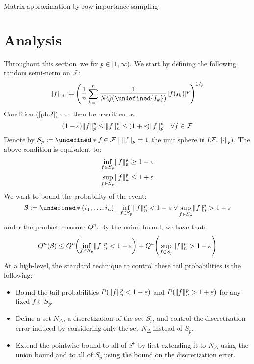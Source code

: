 \documentclass{article}
\theoremstyle{plain}
\theoremstyle{definition}
\theoremstyle{remark}
\newcommand{\defeq}{\vcentcolon=}
\let\brace\undefined
\DeclarePairedDelimiter{\brace}{\lbrace}{\rbrace}
\DeclarePairedDelimiter{\paren}{\lparen}{\rparen}
\newcommand{\eps}{\varepsilon}
\newcommand{\R}{\mathbb{R}}
\DeclarePairedDelimiter{\abs}{\lvert}{\rvert}
\DeclarePairedDelimiter{\norm}{\lVert}{\rVert}
\begin{document}
\begin{algorithm}
\caption{Matrix approximation by row importance sampling}
\label{alg:1}
\begin{algorithmic}[1]
    \State{$\widehat{F} \gets 0 \in \R^{n \times d}$}
    \EndFor
\EndFunction
\end{algorithmic}
\end{algorithm}



\section{Analysis}
Throughout this section, we fix $p \in [1, \infty)$. We start by defining the following random semi-norm on $\mathcal{F}$:
\begin{equation*}
    \norm{f}_n \defeq \paren*{\frac{1}{n} \sum_{k=1}^{n} \frac{1}{NQ(\brace{I_k})} \abs{f(I_k)}^p}^{1/p}
\end{equation*}
Condition (\ref{pb:2}) can then be rewritten as:
\begin{equation*}
    (1 - \eps) \norm{f}_p^p \leq \norm{f}_n^p \leq (1 + \eps) \norm{f}_p^p \quad \forall f \in \mathcal{F}
\end{equation*}
Denote by $S_p \defeq \brace*{f \in \mathcal{F} \mid \norm{f}_p = 1}$ the unit sphere in $(\mathcal{F}, \norm{\cdot}_p)$. The above condition is equivalent to:
\begin{align*}
    \inf_{f \in S_p} \norm{f}_{n}^p &\geq 1 - \eps \\ 
    \sup_{f \in S_p} \norm{f}_n^p &\leq 1 + \eps
\end{align*}
We want to bound the probability of the event:
\begin{equation*}
    \mathcal{B} \defeq \brace*{(i_1, \dotsc, i_n) \mid \inf_{f \in S_p} \norm{f}_{n}^p < 1 - \eps \lor \sup_{f \in S_p} \norm{f}_n^p > 1 + \eps}
\end{equation*}
under the product measure $Q^{n}$. By the union bound, we have that:
\begin{equation*}
    Q^{n}(\mathcal{B}) \leq Q^{n}\paren*{\inf_{f \in S_p} \norm{f}_{n}^p < 1 - \eps} + Q^{n}\paren*{\sup_{f \in S_p} \norm{f}_n^p > 1 + \eps}
\end{equation*}
At a high-level, the standard technique to control these tail probabilities is the following:
\begin{itemize}
    \item Bound the tail probabilities $P(\norm{f}_n^p < 1 - \eps)$ and $P(\norm{f}_n^p > 1 + \eps)$  for any fixed $f \in S_{p}$.
    \item Define a set $N_{\Delta}$, a discretization of the set $S_{p}$, and control the discretization error induced by considering only the set $N_{\Delta}$ instead of $S_p$.
    \item Extend the pointwise bound to all of $S^p$ by first extending it to $N_{\Delta}$ using the union bound and to all of $S_{p}$ using the bound on the discretization error.
\end{itemize}
\end{document}
